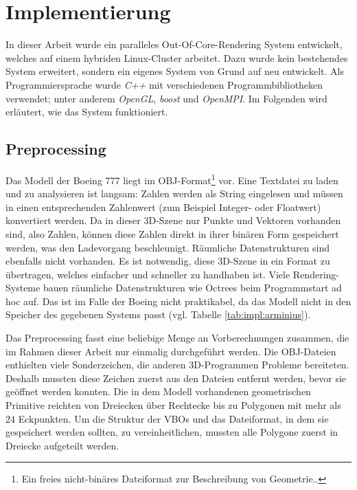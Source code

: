 
\chapter{Implementierung}
\label{chap:impl}
%

In dieser Arbeit wurde ein paralleles Out-Of-Core-Rendering System entwickelt, welches auf einem hybriden Linux-Cluster arbeitet. Dazu wurde kein bestehendes System erweitert, sondern ein eigenes System von Grund auf neu entwickelt. Als Programmiersprache wurde \emph{C++} mit verschiedenen Programmbibliotheken verwendet; unter anderem \emph{OpenGL}, \emph{boost} und \emph{OpenMPI}. Im Folgenden wird erläutert, wie das System funktioniert.



\section{Preprocessing}
\label{sec:impl:preprocessing}
Das Modell der Boeing 777 liegt im OBJ-Format\footnote{Ein freies nicht-binäres Dateiformat zur Beschreibung von Geometrie.. } vor. Eine Textdatei zu laden und zu analysieren ist langsam: Zahlen werden als String eingelesen und müssen in einen entsprechenden Zahlenwert (zum Beispiel Integer- oder Floatwert) konvertiert werden. Da in dieser 3D-Szene nur Punkte und Vektoren vorhanden sind, also Zahlen, können diese Zahlen direkt in ihrer binären Form gespeichert werden, was den Ladevorgang beschleunigt. Räumliche Datenstrukturen sind ebenfalls nicht vorhanden. Es ist notwendig, diese 3D-Szene in ein Format zu übertragen, welches einfacher und schneller zu handhaben ist. Viele Rendering-Systeme bauen räumliche Datenstrukturen wie Octrees beim Programmstart ad hoc auf. Das ist im Falle der Boeing nicht praktikabel, da das Modell nicht in den Speicher des gegebenen Systems passt (vgl. Tabelle \ref{tab:impl:arminius}).

Das Preprocessing fasst eine beliebige Menge an Vorberechnungen zusammen, die im Rahmen dieser Arbeit nur einmalig durchgeführt werden. Die OBJ-Dateien enthielten viele Sonderzeichen, die anderen 3D-Programmen Probleme bereiteten. Deshalb mussten diese Zeichen zuerst aus den Dateien entfernt werden, bevor sie geöffnet werden konnten. Die in dem Modell vorhandenen geometrischen Primitive reichten von Dreiecken über Rechtecke bis zu Polygonen mit mehr als 24 Eckpunkten. Um die Struktur der VBOs und das Dateiformat, in dem sie gespeichert werden sollten, zu vereinheitlichen, mussten alle Polygone zuerst in Dreiecke aufgeteilt werden. 


